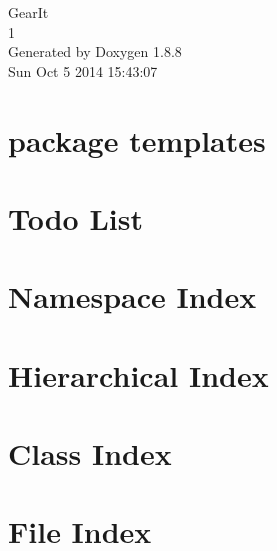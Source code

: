 \documentclass[twoside]{book}
\newcommand{\+}{\discretionary{\mbox{\scriptsize$\hookleftarrow$}}{}{}}
\newcommand{\clearemptydoublepage}{%
  \newpage{\pagestyle{empty}\cleardoublepage}%
}
\begin{document}
\hypersetup{pageanchor=false,
             bookmarks=true,
             bookmarksnumbered=true,
             pdfencoding=unicode
            }
\begin{titlepage}
\vspace*{7cm}
\begin{center}%
{\Large Gear\+It \\[1ex]\large 1 }\\
\vspace*{1cm}
{\large Generated by Doxygen 1.8.8}\\
\vspace*{0.5cm}
{\small Sun Oct 5 2014 15:43:07}\\
\end{center}
\end{titlepage}
\clearemptydoublepage
\tableofcontents
\clearemptydoublepage
{}
\hypersetup{pageanchor=true}

\chapter{package templates}
\label{index}\hypertarget{index}{}
\chapter{Todo List}
\label{todo}
\hypertarget{todo}{}

\chapter{Namespace Index}

\chapter{Hierarchical Index}

\chapter{Class Index}

\chapter{File Index}

\end{document}
